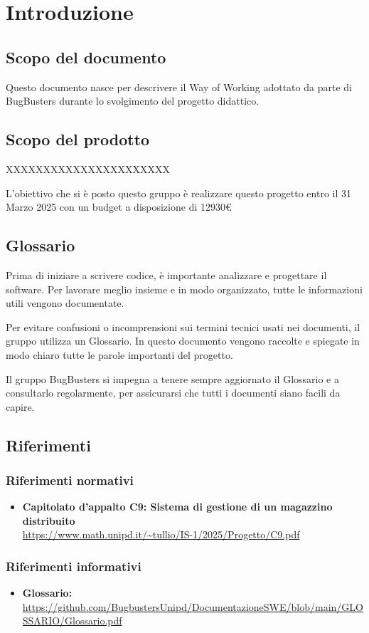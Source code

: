 \documentclass[a4paper,11pt]{article}
\begin{document}
\section{Introduzione}

\subsection{Scopo del documento}
Questo documento nasce per descrivere il Way of Working adottato da parte di BugBusters durante lo svolgimento del progetto didattico.

\subsection{Scopo del prodotto}
XXXXXXXXXXXXXXXXXXXXXX

L'obiettivo che si è posto questo gruppo è realizzare questo progetto entro il 31 Marzo 2025 con un budget a disposizione di 12930€

\subsection{Glossario}
Prima di iniziare a scrivere codice, è importante analizzare e progettare il software. Per lavorare meglio insieme e in modo organizzato, tutte le informazioni utili vengono documentate.

Per evitare confusioni o incomprensioni sui termini tecnici usati nei documenti, il gruppo utilizza un Glossario. In questo documento vengono raccolte e spiegate in modo chiaro tutte le parole importanti del progetto.

Il gruppo BugBusters si impegna a tenere sempre aggiornato il Glossario e a consultarlo regolarmente, per assicurarsi che tutti i documenti siano facili da capire.

\newpage

\subsection{Riferimenti}

\subsubsection{Riferimenti normativi}
\begin{itemize}
\item \textbf{Capitolato d'appalto C9: Sistema di gestione di un magazzino distribuito}\\
\url{https://www.math.unipd.it/~tullio/IS-1/2025/Progetto/C9.pdf}
\end{itemize}

\subsubsection{Riferimenti informativi}
\begin{itemize}
\item \textbf{Glossario:}\\
\url{https://github.com/BugbustersUnipd/DocumentazioneSWE/blob/main/GLOSSARIO/Glossario.pdf}
\end{itemize}
\end{document}

